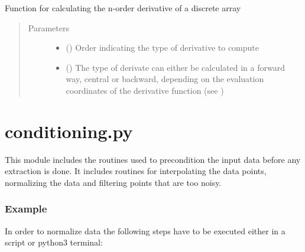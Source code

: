 \documentclass[letterpaper,10pt,english,openany, oneside]{sphinxmanual}
\begin{document}
\begin{fulllineitems}
\label{\detokenize{index:fompy.aux.get_diff}}
Function for calculating the n-order derivative of a discrete array
\begin{quote}\begin{description}
\item[{Parameters}] \leavevmode\begin{itemize}
\item {} 
 () \textendash{} Order indicating the type of derivative to compute

\item {} 
 () \textendash{} The type of derivate can either be calculated in a forward way,
central or backward, depending on the evaluation coordinates
of the derivative function (see )

\end{itemize}

\end{description}\end{quote}

\end{fulllineitems}

\label{\detokenize{index:module-fompy.conditioning}}

\section{conditioning.py}
\label{\detokenize{index:conditioning-py}}
This module includes the routines used to precondition the input data
before any extraction is done. It includes routines for interpolating the
data points, normalizing the data and filtering points that are too noisy.
\subsubsection*{Example}

In order to normalize data the following steps have to be executed either in a script or
python3 terminal:
\end{document}
